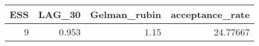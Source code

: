 \begin{longtable}{rrrr}
\toprule
ESS & LAG\_30 & Gelman\_rubin & acceptance\_rate \\ 
\midrule
9 & 0.953 & 1.15 & 24.77667 \\ 
\bottomrule
\end{longtable}

